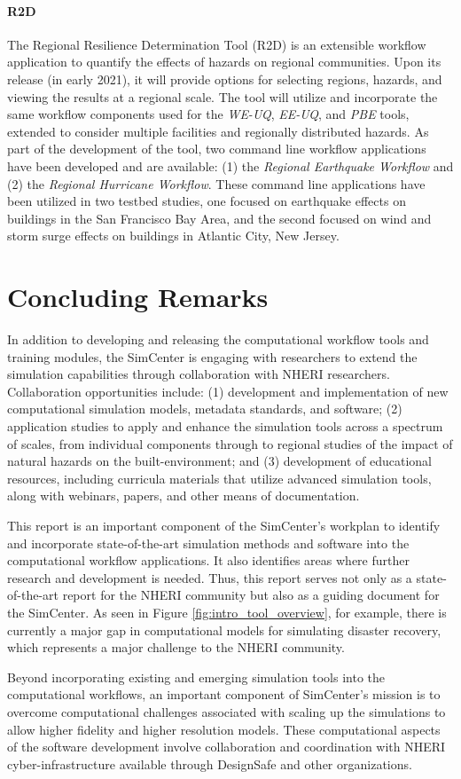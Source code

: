 \paragraph{R2D} The Regional Resilience Determination Tool (R2D) is an extensible workflow application to quantify the effects of hazards on regional communities. Upon its release (in early 2021), it will provide options for selecting regions, hazards, and viewing the results at a regional scale. The tool will utilize and incorporate the same workflow components used for the \emph{WE-UQ}, \emph{EE-UQ}, and \emph{PBE} tools, extended to consider multiple facilities and regionally distributed hazards. As part of the development of the tool, two command line workflow applications have been developed and are available: (1) the \emph{Regional Earthquake Workflow} and (2) the \emph{Regional Hurricane Workflow}.  These command line  applications have been utilized in two testbed studies, one focused on earthquake effects on buildings in the San Francisco Bay Area, and the second focused on wind and storm surge effects on buildings in Atlantic City, New Jersey.

\section{Concluding Remarks}

In addition to developing and releasing the computational workflow tools and training modules, the SimCenter is engaging with researchers to extend the simulation capabilities through collaboration with NHERI researchers. Collaboration opportunities include: (1) development and implementation of new computational simulation models, metadata standards, and software; (2) application studies to apply and enhance the simulation tools across a spectrum of scales, from individual components through to regional studies of the impact of natural hazards on the built-environment; and (3) development of educational resources, including curricula materials that utilize advanced simulation tools, along with webinars, papers, and other means of documentation. 

This report is an important component of the SimCenter’s workplan to identify and incorporate state-of-the-art simulation methods and software into the computational workflow applications. It also identifies areas where further research and development is needed.  Thus, this report serves not only as a state-of-the-art report for the NHERI community but also as a guiding document for the SimCenter.  As seen in Figure \ref{fig:intro_tool_overview}, for example, there is currently a major gap in computational models for simulating disaster recovery, which represents a major challenge to the NHERI community. 

Beyond incorporating existing and emerging simulation tools into the computational workflows, an important component of SimCenter’s mission is to overcome computational challenges associated with scaling up the simulations to allow higher fidelity and higher resolution models.  These computational aspects of the software development involve collaboration and coordination with NHERI cyber-infrastructure available through DesignSafe and other organizations. 